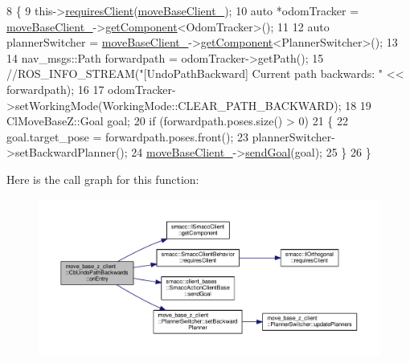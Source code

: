 \begin{DoxyCode}
8 \{
9     this->\hyperlink{classsmacc_1_1SmaccClientBehavior_a917f001e763a1059af337bf4e164f542}{requiresClient}(\hyperlink{classmove__base__z__client_1_1CbUndoPathBackwards_a19e7ace85698725a1d2730a7c6b3aa7d}{moveBaseClient\_});
10     \textcolor{keyword}{auto} *odomTracker = \hyperlink{classmove__base__z__client_1_1CbUndoPathBackwards_a19e7ace85698725a1d2730a7c6b3aa7d}{moveBaseClient\_}->\hyperlink{classsmacc_1_1ISmaccClient_adef78db601749ca63c19e74a27cb88cc}{getComponent}<OdomTracker>();
11 
12     \textcolor{keyword}{auto} plannerSwitcher = \hyperlink{classmove__base__z__client_1_1CbUndoPathBackwards_a19e7ace85698725a1d2730a7c6b3aa7d}{moveBaseClient\_}->\hyperlink{classsmacc_1_1ISmaccClient_adef78db601749ca63c19e74a27cb88cc}{getComponent}<PlannerSwitcher>();
13 
14     nav\_msgs::Path forwardpath = odomTracker->getPath();
15     \textcolor{comment}{//ROS\_INFO\_STREAM("[UndoPathBackward] Current path backwards: " << forwardpath);}
16 
17     odomTracker->setWorkingMode(WorkingMode::CLEAR\_PATH\_BACKWARD);
18 
19     ClMoveBaseZ::Goal goal;
20     \textcolor{keywordflow}{if} (forwardpath.poses.size() > 0)
21     \{
22         goal.target\_pose = forwardpath.poses.front();
23         plannerSwitcher->setBackwardPlanner();
24         \hyperlink{classmove__base__z__client_1_1CbUndoPathBackwards_a19e7ace85698725a1d2730a7c6b3aa7d}{moveBaseClient\_}->\hyperlink{classsmacc_1_1client__bases_1_1SmaccActionClientBase_a9c47a5094ac8afb01680307fe5eca922}{sendGoal}(goal);
25     \}
26 \}
\end{DoxyCode}


Here is the call graph for this function\+:\nopagebreak
\begin{figure}[H]
\begin{center}
\leavevmode
\includegraphics[width=350pt]{classmove__base__z__client_1_1CbUndoPathBackwards_a2793c69857aa97337d56ff79dee20508_cgraph}
\end{center}
\end{figure}




